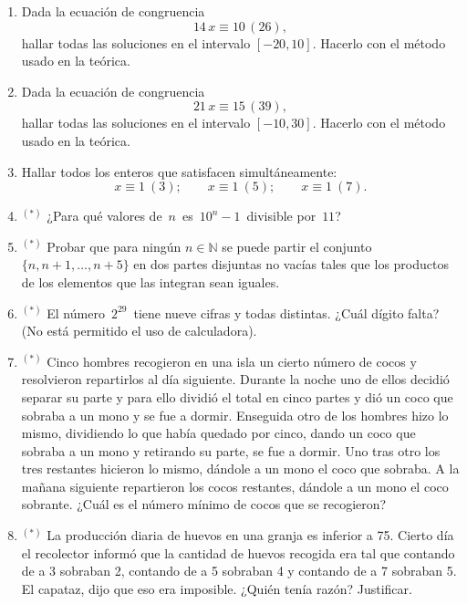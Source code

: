 \documentclass[a4paper,12pt,twoside,spanish,reqno]{amsbook}
\numberwithin{equation}{section}
\begin{document}
\begin{enumerate}[resume]

\item Dada la ecuación de congruencia
    \begin{equation*}
        14\,x\equiv 10 \, (26),
    \end{equation*}
    hallar todas las soluciones en el intervalo $[-20,10]$. Hacerlo con el método usado en la teórica.

\item Dada la ecuación de congruencia
    \begin{equation*}
        21\,x\equiv 15 \, (39),
    \end{equation*}
    hallar todas las soluciones en el intervalo $[-10,30]$. Hacerlo con el método usado en la teórica. 

\item Hallar todos los enteros que satisfacen simultáneamente:
    \begin{equation*}
        x \equiv 1\ ( 3);  \qquad x \equiv 1 \ ( 5); \qquad x \equiv 1\ ( 7).
    \end{equation*}

\item${}^{(*)}$  ¿Para qué valores de \,$n$\, es \,$10^n-1$\, divisible por \,$11$?

\item${}^{(*)}$ Probar que para ningún $n\in\mathbb N$ se puede partir el conjunto $\{n,n+1,\ldots, n+5\}$ en dos partes disjuntas no vacías tales que los productos de los elementos que las integran sean iguales.

\item${}^{(*)}$  El número \,$2^{29}$\, tiene nueve cifras y todas distintas. ¿Cuál dígito falta? (No está permitido el uso de calculadora).


\item${}^{(*)}$ Cinco hombres recogieron en una isla un cierto número de cocos y resolvieron repartirlos al día siguiente. Durante la noche uno de ellos decidió separar su parte y para ello dividió el total en cinco partes y dió un coco que sobraba a un mono y se fue a dormir. Enseguida otro de los hombres hizo lo mismo, dividiendo lo que había quedado por cinco, dando un coco que sobraba a un mono y retirando su parte, se fue a dormir. Uno tras otro los tres restantes hicieron lo mismo, dándole a un mono el coco que sobraba. A la ma\~nana siguiente repartieron los cocos restantes, dándole a un mono el coco sobrante. ¿Cuál es el número mínimo de cocos que se recogieron?


\item${}^{(*)}$ La producción diaria de huevos en una granja es inferior a 75. Cierto día el recolector informó que la cantidad de huevos recogida era tal que contando de a 3 sobraban 2, contando de a 5 sobraban 4 y contando de a 7 sobraban 5. El capataz, dijo que eso era imposible. ¿Quién tenía razón? Justificar.

%
\end{enumerate}
\end{document}
